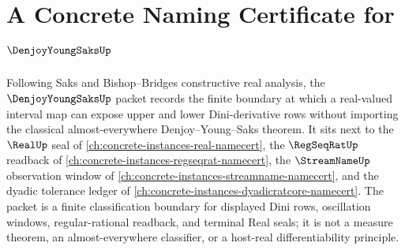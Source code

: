 \chapter{A Concrete Naming Certificate for $\DenjoyYoungSaksUp$}
\label{ch:concrete-instances-denjoy-young-saks-namecert}

Following Saks and Bishop--Bridges constructive real analysis, the $\DenjoyYoungSaksUp$ packet records the finite boundary at which a real-valued interval map can expose upper and lower Dini-derivative rows without importing the classical almost-everywhere Denjoy--Young--Saks theorem. It sits next to the $\RealUp$ seal of \autoref{ch:concrete-instances-real-namecert}, the $\RegSeqRatUp$ readback of \autoref{ch:concrete-instances-regseqrat-namecert}, the $\StreamNameUp$ observation window of \autoref{ch:concrete-instances-streamname-namecert}, and the dyadic tolerance ledger of \autoref{ch:concrete-instances-dyadicratcore-namecert}. The packet is a finite classification boundary for displayed Dini rows, oscillation windows, regular-rational readback, and terminal Real seals; it is not a measure theorem, an almost-everywhere classifier, or a host-real differentiability principle.

